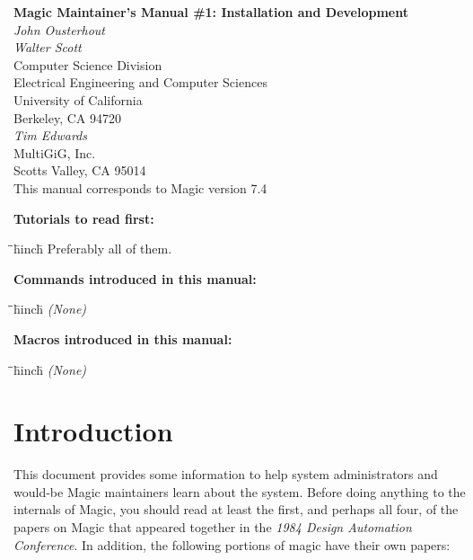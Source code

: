 \documentclass[letterpaper,twoside,12pt]{article}
\def\hinch{\hspace*{0.5in}}
\def\starti{\begin{center}\begin{tabbing}\hinch\=\hinch\=
	\hinch\=hinch\hinch\=\kill}
\def\endi{\end{tabbing}\end{center}}
\def\mytitle{Magic Maintainer's Manual \#1: Installation and Development}
\begin{document}
\makeatletter
\newcommand{\ps@magic}{%
	\renewcommand{\@oddhead}{\mytitle\hfil\today}%
	\renewcommand{\@evenhead}{\today\hfil\mytitle}%
	\renewcommand{\@evenfoot}{\hfil\textrm{--{\thepage}--}\hfil}%
	\renewcommand{\@oddfoot}{\@evenfoot}}
\newcommand{\ps@mplain}{%
	\renewcommand{\@oddhead}{}%
	\renewcommand{\@evenhead}{}%
	\renewcommand{\@evenfoot}{\hfil\textrm{--{\thepage}--}\hfil}%
	\renewcommand{\@oddfoot}{\@evenfoot}}
\makeatother
\pagestyle{magic}
\thispagestyle{mplain}


\begin{center}
  {\bfseries \Large \mytitle} \\
  \vspace*{0.5in}
  {\itshape John Ousterhout} \\
  {\itshape Walter Scott} \\
  \vspace*{0.5in}
   Computer Science Division \\
   Electrical Engineering and Computer Sciences \\
   University of California \\
   Berkeley, CA  94720 \\
  \vspace*{0.25in}
  {\itshape Tim Edwards} \\
  MultiGiG, Inc. \\
  Scotts Valley, CA 95014 \\
  \vspace*{0.25in}
  This manual corresponds to Magic version 7.4 \\
\end{center}
\vspace*{0.5in}

{\noindent\bfseries\large Tutorials to read first:}
\starti
   \> Preferably all of them.
\endi

{\noindent\bfseries\large Commands introduced in this manual:}
\starti
   \> {\itshape (None)}
\endi

{\noindent\bfseries\large Macros introduced in this manual:}

\starti
   \> {\itshape (None)}
\endi

\vspace*{0.75in}
\section{Introduction}

This document provides some information to help system administrators
and would-be Magic maintainers learn about the system.
Before doing anything to the internals of Magic, you should read at
least the first, and perhaps all four, of the papers on Magic that
appeared together in the {\itshape 1984 Design Automation Conference}.
In addition, the following portions of magic have their own papers:
\end{document}
